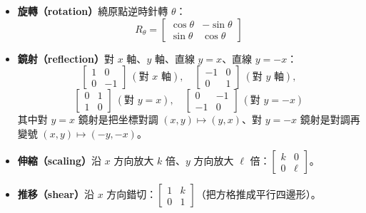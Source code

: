 \documentclass[11pt]{article}
\begin{document}
\begin{itemize}\setlength{\itemsep}{3pt}
\item \textbf{旋轉（rotation）}繞原點逆時針轉 $\theta$：
$$R_\theta=\begin{bmatrix} \cos\theta & -\sin\theta\\ \sin\theta & \cos\theta \end{bmatrix}$$
\item \textbf{鏡射（reflection）}對 $x$ 軸、$y$ 軸、直線 $y=x$、直線 $y=-x$：
$$\begin{bmatrix} 1 & 0\\ 0 & -1 \end{bmatrix}\ (\text{對 }x\text{ 軸}),\quad \begin{bmatrix} -1 & 0\\ 0 & 1 \end{bmatrix}\ (\text{對 }y\text{ 軸}),$$
$$\begin{bmatrix} 0 & 1\\ 1 & 0 \end{bmatrix}\ (\text{對 }y=x),\quad \begin{bmatrix} 0 & -1\\ -1 & 0 \end{bmatrix}\ (\text{對 }y=-x)$$
其中對 $y=x$ 鏡射是把坐標對調 $(x,y)\mapsto(y,x)$、對 $y=-x$ 鏡射是對調再變號 $(x,y)\mapsto(-y,-x)$。
\item \textbf{伸縮（scaling）}沿 $x$ 方向放大 $k$ 倍、$y$ 方向放大 $\ell$ 倍：$\begin{bmatrix} k & 0\\ 0 & \ell \end{bmatrix}$。
\item \textbf{推移（shear）}沿 $x$ 方向錯切：$\begin{bmatrix} 1 & k\\ 0 & 1 \end{bmatrix}$（把方格推成平行四邊形）。
\end{itemize}


\end{document}
